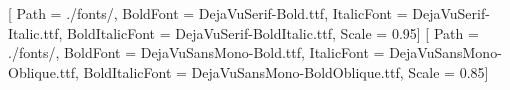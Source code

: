 \usepackage{fontspec}
\setmainfont{DejaVuSerif.ttf}[
  Path = ./fonts/,
  BoldFont = DejaVuSerif-Bold.ttf,
  ItalicFont = DejaVuSerif-Italic.ttf,
  BoldItalicFont = DejaVuSerif-BoldItalic.ttf,
  Scale = 0.95]
\setmonofont{DejaVuSansMono.ttf}[
  Path = ./fonts/,
  BoldFont = DejaVuSansMono-Bold.ttf,
  ItalicFont = DejaVuSansMono-Oblique.ttf,
  BoldItalicFont = DejaVuSansMono-BoldOblique.ttf,
  Scale = 0.85]
\usepackage{amsmath,amssymb}
\usepackage{microtype}
